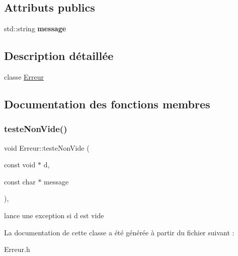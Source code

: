 \subsection*{Attributs publics}
\begin{DoxyCompactItemize}
\item 
\mbox{\label{class_erreur_ab40f3a7406b1c80742c1d8a2744f959b}} 
std\+::string {\bfseries message}
\end{DoxyCompactItemize}


\subsection{Description détaillée}
classe \mbox{\hyperlink{class_erreur}{Erreur}} 

\subsection{Documentation des fonctions membres}
\mbox{\label{class_erreur_ad318a27a06c5c1f68506eb00b9fe6beb}} 
\subsubsection{\texorpdfstring{testeNonVide()}{testeNonVide()}}
{\footnotesize\ttfamily void Erreur\+::teste\+Non\+Vide (\begin{DoxyParamCaption}\item[{const void $\ast$}]{d,  }\item[{const char $\ast$}]{message }\end{DoxyParamCaption})\hspace{0.3cm}{\ttfamily [inline]}, {\ttfamily [static]}}

lance une exception si d est vide 

La documentation de cette classe a été générée à partir du fichier suivant \+:\begin{DoxyCompactItemize}
\item 
Erreur.\+h\end{DoxyCompactItemize}
